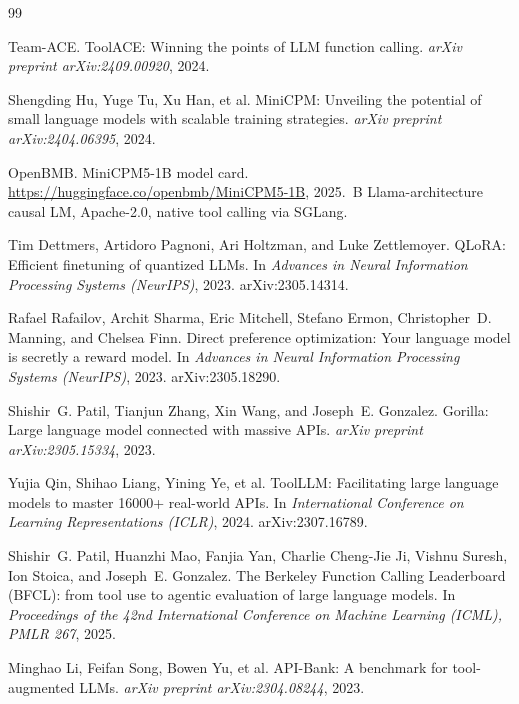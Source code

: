 \documentclass[11pt]{article}
\begin{document}
\begin{thebibliography}{99}

Team-ACE.
\newblock ToolACE: Winning the points of LLM function calling.
\newblock \emph{arXiv preprint arXiv:2409.00920}, 2024.

Shengding Hu, Yuge Tu, Xu Han, et al.
\newblock MiniCPM: Unveiling the potential of small language models with
  scalable training strategies.
\newblock \emph{arXiv preprint arXiv:2404.06395}, 2024.

OpenBMB.
\newblock MiniCPM5-1B model card.
\newblock \url{https://huggingface.co/openbmb/MiniCPM5-1B}, 2025.
\,B Llama-architecture causal LM, Apache-2.0, native tool
  calling via SGLang.

Tim Dettmers, Artidoro Pagnoni, Ari Holtzman, and Luke Zettlemoyer.
\newblock QLoRA: Efficient finetuning of quantized LLMs.
\newblock In \emph{Advances in Neural Information Processing Systems
  (NeurIPS)}, 2023.
\newblock arXiv:2305.14314.

Rafael Rafailov, Archit Sharma, Eric Mitchell, Stefano Ermon,
  Christopher~D. Manning, and Chelsea Finn.
\newblock Direct preference optimization: Your language model is secretly a
  reward model.
\newblock In \emph{Advances in Neural Information Processing Systems
  (NeurIPS)}, 2023.
\newblock arXiv:2305.18290.

Shishir~G. Patil, Tianjun Zhang, Xin Wang, and Joseph~E. Gonzalez.
\newblock Gorilla: Large language model connected with massive APIs.
\newblock \emph{arXiv preprint arXiv:2305.15334}, 2023.

Yujia Qin, Shihao Liang, Yining Ye, et al.
\newblock ToolLLM: Facilitating large language models to master 16000+
  real-world APIs.
\newblock In \emph{International Conference on Learning Representations
  (ICLR)}, 2024.
\newblock arXiv:2307.16789.

Shishir~G. Patil, Huanzhi Mao, Fanjia Yan, Charlie Cheng-Jie Ji,
  Vishnu Suresh, Ion Stoica, and Joseph~E. Gonzalez.
\newblock The Berkeley Function Calling Leaderboard (BFCL): from tool use
  to agentic evaluation of large language models.
\newblock In \emph{Proceedings of the 42nd International Conference on
  Machine Learning (ICML), PMLR 267}, 2025.

Minghao Li, Feifan Song, Bowen Yu, et al.
\newblock API-Bank: A benchmark for tool-augmented LLMs.
\newblock \emph{arXiv preprint arXiv:2304.08244}, 2023.


\end{thebibliography}
\end{document}
